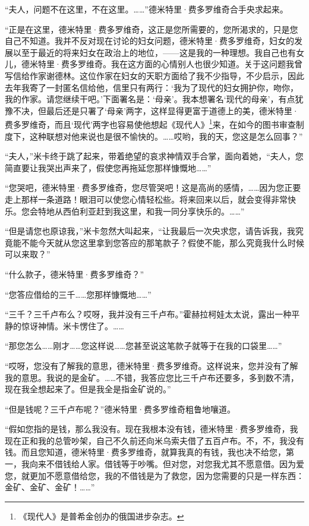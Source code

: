 \par “夫人，问题不在这里，不在这里。……”德米特里·费多罗维奇合手央求起来。
\par “正是在这里，德米特里·费多罗维奇，这正是您所需要的，您所渴求的，只是您自己不知道。我并不反对现在讨论的妇女问题，德米特里·费多罗维奇，妇女的发展以至于最近的将来妇女在政治上的地位，——这是我的一种理想。我自己也有女儿，德米特里·费多罗维奇。我在这方面的心情别人也很少知道。关于这问题我曾写信给作家谢德林。这位作家在妇女的天职方面给了我不少指导，不少启示，因此去年我寄了一封匿名信给他，信里只有两行：‘我为了现代的妇女拥护你，吻你，我的作家。请您继续干吧。’下面署名是：‘母亲’。我本想署名‘现代的母亲’，有点犹豫不决，但最后还是只署了‘母亲’两字，这样显得更富于道德上的美，德米特里·费多罗维奇，而且‘现代’两字也容易使他想起《现代人》\footnote{《现代人》是普希金创办的俄国进步杂志。}来，在如今的图书审查制度下，这种联想对他来说也是很不愉快的。……哎哟，我的天，您这是怎么回事？”
\par “夫人，”米卡终于跳了起来，带着绝望的哀求神情双手合掌，面向着她，“夫人，您简直要让我哭出声来了，假使您再拖延您那样慷慨地……”
\par “您哭吧，德米特里·费多罗维奇，您尽管哭吧！这是高尚的感情，……因为您正要走上那样一条道路！眼泪可以使您心情轻松些。将来回来以后，就会变得非常快乐。您会特地从西伯利亚赶到我这里，和我一同分享快乐的。……”
\par “但是请您也原谅我，”米卡忽然大叫起来，“让我最后一次央求您，请告诉我，我究竟能不能今天就从您这里拿到您答应的那笔款子？假使不能，那么究竟我什么时候可以来取？”
\par “什么款子，德米特里·费多罗维奇？”
\par “您答应借给的三千……您那样慷慨地……”
\par “三千？三千卢布么？哎呀，我并没有三千卢布。”霍赫拉柯娃太太说，露出一种平静的惊讶神情。米卡愣住了。……
\par “那您怎么……刚才……您这样说……您甚至说这笔款子就等于在我的口袋里……”
\par “哎呀，您没有了解我的意思，德米特里·费多罗维奇。这样说来，您并没有了解我的意思。我说的是金矿。……不错，我答应您比三千卢布还要多，多到数不清，现在我全想起来了。但是我全是指金矿说的。”
\par “但是钱呢？三千卢布呢？”德米特里·费多罗维奇粗鲁地嚷道。
\par “假如您指的是钱，那么我没有。现在我根本没有钱，德米特里·费多罗维奇，我现在正和我的总管吵架，自己不久前还向米乌索夫借了五百卢布。不，不，我没有钱。而且您知道，德米特里·费多罗维奇，就算我真的有钱，我也决不给您，第一，我向来不借钱给人家。借钱等于吵嘴。但对您，对您我尤其不愿意借。因为爱您，就更加不愿意借给您，我的不借钱是为了救您，因为您需要的只是一样东西：金矿、金矿、金矿！……”
